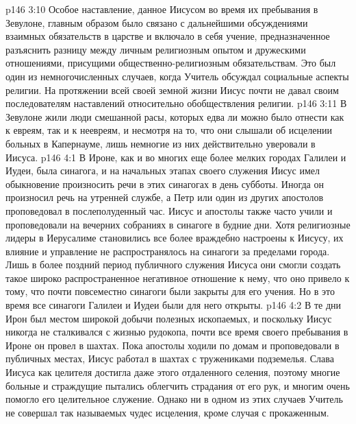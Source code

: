 \vs p146 3:10 \pc Особое наставление, данное Иисусом во время их пребывания в Зевулоне, главным образом было связано с дальнейшими обсуждениями взаимных обязательств в царстве и включало в себя учение, предназначенное разъяснить разницу между личным религиозным опытом и дружескими отношениями, присущими общественно\hyp{}религиозным обязательствам. Это был один из немногочисленных случаев, когда Учитель обсуждал социальные аспекты религии. На протяжении всей своей земной жизни Иисус почти не давал своим последователям наставлений относительно обобществления религии.
\vs p146 3:11 В Зевулоне жили люди смешанной расы, которых едва ли можно было отнести как к евреям, так и к неевреям, и несмотря на то, что они слышали об исцелении больных в Капернауме, лишь немногие из них действительно уверовали в Иисуса.
\vs p146 4:1 В Ироне, как и во многих еще более мелких городах Галилеи и Иудеи, была синагога, и на начальных этапах своего служения Иисус имел обыкновение произносить речи в этих синагогах в день субботы. Иногда он произносил речь на утренней службе, а Петр или один из других апостолов проповедовал в послеполуденный час. Иисус и апостолы также часто учили и проповедовали на вечерних собраниях в синагоге в будние дни. Хотя религиозные лидеры в Иерусалиме становились все более враждебно настроены к Иисусу, их влияние и управление не распространялось на синагоги за пределами города. Лишь в более поздний период публичного служения Иисуса они смогли создать такое широко распространенное негативное отношение к нему, что оно привело к тому, что почти повсеместно синагоги были закрыты для его учения. Но в это время все синагоги Галилеи и Иудеи были для него открыты.
\vs p146 4:2 В те дни Ирон был местом широкой добычи полезных ископаемых, и поскольку Иисус никогда не сталкивался с жизнью рудокопа, почти все время своего пребывания в Ироне он провел в шахтах. Пока апостолы ходили по домам и проповедовали в публичных местах, Иисус работал в шахтах с тружениками подземелья. Слава Иисуса как целителя достигла даже этого отдаленного селения, поэтому многие больные и страждущие пытались облегчить страдания от его рук, и многим очень помогло его целительное служение. Однако ни в одном из этих случаев Учитель не совершал так называемых чудес исцеления, кроме случая с прокаженным.
